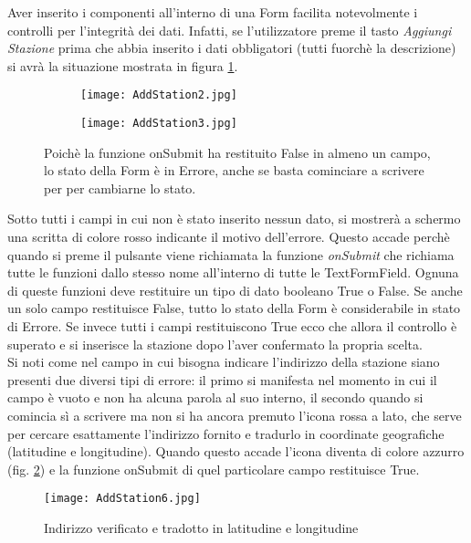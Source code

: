 Aver
inserito i componenti all'interno di una Form facilita notevolmente i controlli
per l'integrità dei dati. Infatti, se l'utilizzatore preme il tasto
\textit{Aggiungi Stazione} prima che abbia inserito i dati obbligatori (tutti
fuorchè la descrizione) si avrà la situazione mostrata in figura \ref{addStation2}.
\begin{figure}[!h]
    \centering
    \begin{subfigure}{0.3\linewidth}
        \texttt{[image: AddStation2.jpg]}
    \end{subfigure}
    \begin{subfigure}{0.3\linewidth}
        \texttt{[image: AddStation3.jpg]}
    \end{subfigure}
    \caption{Poichè la funzione onSubmit ha restituito False in almeno un campo,
    lo stato della Form è in Errore, anche se basta cominciare a scrivere per
    per cambiarne lo stato.}
    \label{addStation2}
\end{figure}
Sotto tutti i campi in cui non è stato inserito nessun dato, si mostrerà a
schermo una scritta di colore rosso indicante il motivo dell'errore. Questo
accade perchè quando si preme il pulsante viene richiamata la funzione
\textit{onSubmit} che richiama tutte le funzioni dallo stesso nome all'interno
di tutte le TextFormField. Ognuna di queste funzioni deve restituire un tipo di
dato booleano
True o False. Se anche un solo campo restituisce False, tutto lo stato della
Form è considerabile in stato di Errore. Se invece tutti i campi restituiscono
True ecco che allora il controllo è superato e si inserisce la stazione dopo
l'aver confermato la propria scelta. \\
Si  noti come nel campo in cui bisogna indicare l'indirizzo della stazione siano
presenti due diversi tipi di errore: il primo si manifesta nel momento in cui il
campo è vuoto e non ha alcuna parola al suo interno, il secondo quando si
comincia sì a scrivere ma non si ha ancora premuto l'icona rossa a lato, che
serve per cercare esattamente l'indirizzo fornito e tradurlo in coordinate
geografiche (latitudine e longitudine). Quando questo accade l'icona diventa di
colore azzurro (fig. \ref{addStation6}) e la funzione onSubmit di quel particolare campo
restituisce True.
\begin{figure}[!h]
    \centering
    \texttt{[image: AddStation6.jpg]}
    \caption{Indirizzo verificato e tradotto in latitudine e longitudine}
    \label{addStation6}
\end{figure}  
